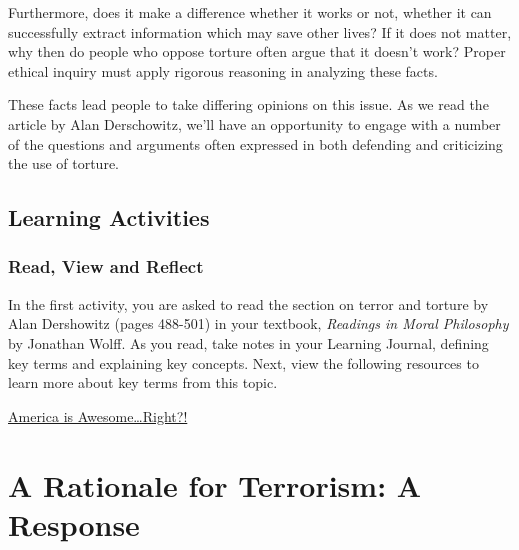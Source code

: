 \documentclass[
]{book}
\begin{document}
Furthermore, does it make a difference whether it works or not, whether it can successfully extract information which may save other lives? If it does not matter, why then do people who oppose torture often argue that it doesn't work? Proper ethical inquiry must apply rigorous reasoning in analyzing these facts.

These facts lead people to take differing opinions on this issue. As we read the article by Alan Derschowitz, we'll have an opportunity to engage with a number of the questions and arguments often expressed in both defending and criticizing the use of torture.

\hypertarget{learning-activities-21}{%
\subsection*{Learning Activities}\label{learning-activities-21}}

\begin{reflect}
\hypertarget{read-view-and-reflect-29}{%
\subsubsection*{Read, View and Reflect}\label{read-view-and-reflect-29}}

In the first activity, you are asked to read the section on terror and torture by Alan Dershowitz (pages 488-501) in your textbook, \emph{Readings in Moral Philosophy} by Jonathan Wolff. As you read, take notes in your Learning Journal, defining key terms and explaining key concepts.
Next, view the following resources to learn more about key terms from this topic.

\href{https://ethicsunwrapped.utexas.edu/america-awesome-right}{America is Awesome\ldots Right?!}
\end{reflect}

\hypertarget{a-rationale-for-terrorism-a-response}{%
\section*{A Rationale for Terrorism: A Response}\label{a-rationale-for-terrorism-a-response}}
\end{document}
